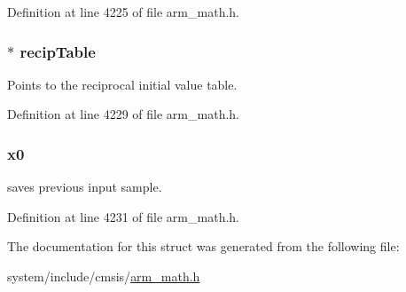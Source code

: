 Definition at line 4225 of file arm\+\_\+math.\+h.

\subsubsection[{\texorpdfstring{recip\+Table}{recipTable}}]{$\ast$ recip\+Table}\hypertarget{structarm__lms__norm__instance__q15_a39b65b32f68643831304cece01e093bd}{}\label{structarm__lms__norm__instance__q15_a39b65b32f68643831304cece01e093bd}
Points to the reciprocal initial value table. 

Definition at line 4229 of file arm\+\_\+math.\+h.

\subsubsection[{\texorpdfstring{x0}{x0}}]{ x0}\hypertarget{structarm__lms__norm__instance__q15_a3c975fed200b19723a2ed11efccca6cd}{}\label{structarm__lms__norm__instance__q15_a3c975fed200b19723a2ed11efccca6cd}
saves previous input sample. 

Definition at line 4231 of file arm\+\_\+math.\+h.



The documentation for this struct was generated from the following file\+:\begin{DoxyCompactItemize}
\item 
system/include/cmsis/\hyperlink{arm__math_8h}{arm\+\_\+math.\+h}\end{DoxyCompactItemize}
